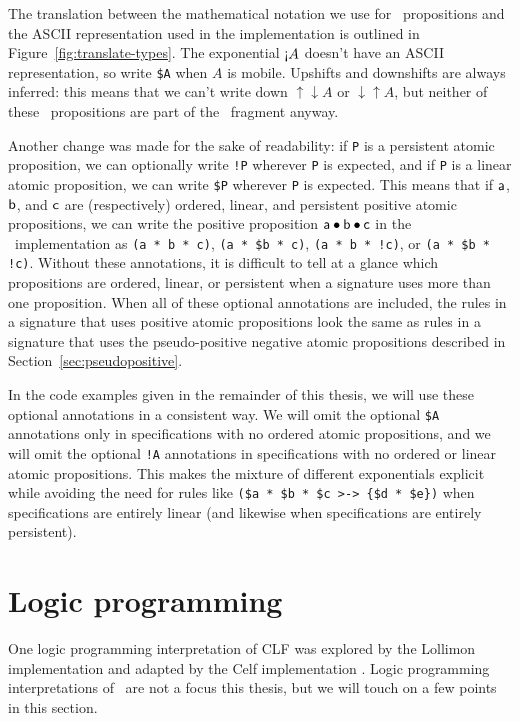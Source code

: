 The
translation between the mathematical notation we use for
\sls~propositions and the ASCII representation used in the
implementation is outlined in Figure~\ref{fig:translate-types}.
The exponential ${\gnab}A$ doesn't have an ASCII
representation, so write \verb|$A| when $A$ is mobile. Upshifts and
downshifts are always inferred: this means that we can't write down
${\uparrow}{\downarrow}A$ or ${\downarrow}{\uparrow}A$, but neither of
these \ollll~propositions are part of the \sls~fragment anyway. 

Another change was made for the sake of readability: if \verb|P| is a
persistent atomic proposition, we can optionally write \verb|!P|
wherever \verb|P| is expected, and if \verb|P| is a linear atomic
proposition, we can write \verb|$P| wherever \verb|P| is
expected. This means that if ${\sf a}$, ${\sf b}$, and ${\sf c}$ are
(respectively) ordered, linear, and persistent positive atomic
propositions, we can write the positive proposition ${\sf a} \mathbin{\bullet}
{\sf b} \mathbin{\bullet} {\sf c}$ in the \sls~implementation as
\verb|(a * b * c)|, \verb|(a * $b * c)|, \verb|(a * b * !c)|, or
\verb|(a * $b * !c)|. Without these annotations, it is difficult to
tell at a glance which propositions are ordered, linear, or persistent
when a signature uses more than one proposition. When all of these
optional annotations are included, the rules in a signature that uses
positive atomic propositions look the same as rules in a signature
that uses the pseudo-positive negative atomic propositions described
in Section~\ref{sec:pseudopositive}. 

In the code examples given in the remainder of this thesis, we will
use these optional annotations in a consistent way.  We will omit the
optional \verb|$A| annotations only in specifications with no ordered
atomic propositions, and we will omit the optional \verb|!A|
annotations in specifications with no ordered or linear atomic
propositions. This makes the mixture of different exponentials
explicit while avoiding the need for rules like
\verb|($a * $b * $c >-> {$d * $e})| when specifications are entirely
linear (and likewise when specifications are entirely persistent).

\section{Logic programming}
\label{sec:framework-logicprog}

One logic programming interpretation of CLF was explored by the
Lollimon implementation \cite{lopez05monadic} and adapted by the Celf
implementation \cite{schacknielsen08celf}. Logic programming
interpretations of \sls~are not a focus this thesis, but we will touch
on a few points in this section. 


